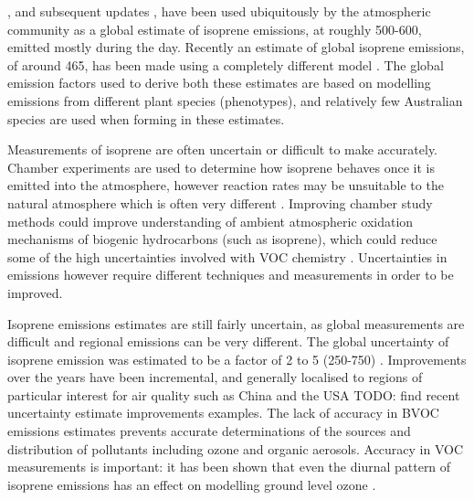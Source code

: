     \textcite{Guenther1995}, and subsequent updates \parencite{Guenther2000,Guenther2006,Guenther2012}, have been used ubiquitously by the atmospheric community as a global estimate of isoprene emissions, at roughly 500-600\tgpyr, emitted mostly during the day.
    Recently an estimate of global isoprene emissions, of around 465\tgcpyr, has been made using a completely different model \parencite{Messina2016}.
    The global emission factors used to derive both these estimates are based on modelling emissions from different plant species (phenotypes), and relatively few Australian species are used when forming in these estimates.
    
    
    
    
    Measurements of isoprene are often uncertain or difficult to make accurately.
    Chamber experiments are used to determine how isoprene behaves once it is emitted into the atmosphere, however reaction rates may be unsuitable to the natural atmosphere which is often very different \parencite{Kanakidou2005,Nguyen2014}.
    Improving chamber study methods could improve understanding of ambient atmospheric oxidation mechanisms of biogenic hydrocarbons (such as isoprene), which could reduce some of the high uncertainties involved with VOC chemistry \parencite{Nguyen2014}.
    Uncertainties in emissions however require different techniques and measurements in order to be improved.
    
    Isoprene emissions estimates are still fairly uncertain, as global measurements are difficult and regional emissions can be very different. 
    The global uncertainty of isoprene emission was estimated to be a factor of 2 to 5 (250-750\tgpyr) \parencite{Kanakidou2005}.
    Improvements over the years have been incremental, and generally localised to regions of particular interest for air quality such as China and the USA TODO: find recent uncertainty estimate improvements examples.
    The lack of accuracy in BVOC emissions estimates prevents accurate determinations of the sources and distribution of pollutants including ozone and organic aerosols.
    Accuracy in VOC measurements is important: it has been shown that even the diurnal pattern of isoprene emissions has an effect on modelling ground level ozone \parencite{Hewitt2011, Fan2004}.
    
